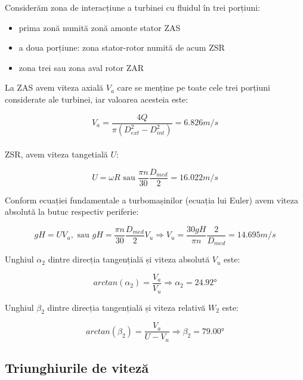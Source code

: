 Considerăm zona de interacțiune a turbinei cu fluidul în trei porțiuni:
\begin{itemize}
	\item prima zonă numită zonă amonte stator ZAS
	\item a doua porțiune: zona stator-rotor numită de acum ZSR
	\item zona trei sau zona aval rotor ZAR
\end{itemize}

La ZAS avem viteza axială $V_{a}$ care se menține pe toate cele trei porțiuni considerate ale turbinei, iar valoarea acesteia este:

\begin{equation}
V_a=\frac{4Q}{\pi(D_{ext}^2-D_{int}^2)}=6.826\si{m/s}
\end{equation}\\

\In ZSR, avem viteza tangetială $U$:

\begin{equation}
U=\omega R \text{ sau } \frac{\pi n}{30} \frac{D_{med}}{2}=16.022\si{m/s}
\end{equation}

Conform ecuației fundamentale a turbomașinilor (ecuația lui Euler) avem viteza absolută la butuc respectiv periferie:

\begin{equation}
gH=UV_{u}, \text{ sau } gH=\frac{\pi n}{30} \frac{D_{med}}{2} V_{u} \Rightarrow V_{u}=\frac{30gH}{\pi n} \frac{2}{D_{med}}=14.695\si{m/s}
\end{equation}


Unghiul $\alpha_2$ dintre direcția tangențială și viteza absolută $V_u$ este:

\begin{equation}
arctan(\alpha_{2 })=\frac{V_{a}}{V_{u}} \Rightarrow \alpha_{2}=24.92\si{\degree}
\end{equation}



Unghiul $\beta_2$ dintre direcția tangențială și viteza relativă $W_2$ este:

\begin{equation}
arctan(\beta_{2})=\frac{V_{a}}{U - V_{u}} \Rightarrow \beta_{2} =79.00\si{\degree}
\end{equation}


\subsection{Triunghiurile de viteză}

